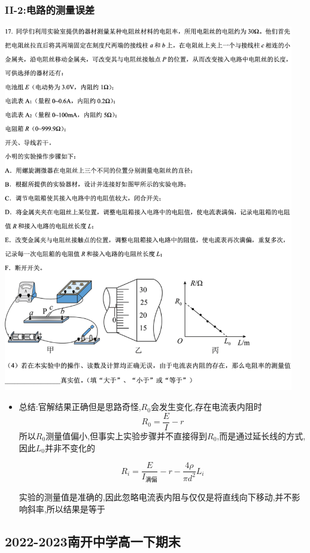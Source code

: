 \documentclass{article}
\begin{document}
\subsubsection{II-2:电路的测量误差}
\includegraphics[width=0.95\textwidth,keepaspectratio]{./pictures/1.3-3.png}

\begin{itemize}
    \item 总结:\quad 官解结果正确但是思路奇怪,$R_{0}$会发生变化,存在电流表内阻时
          $$
              R_{0} = \frac{E}{I} - r
          $$
          所以$R_{0}$测量值偏小,但事实上实验步骤并不直接得到$R_{0}$,而是通过延长线的方式,因此$L_{0}$并非不变化的

          $$
              R_{i} = \frac{E}{I_{满偏}} - r -\frac{4\rho}{\pi d^{2}} L_{i}
          $$

          实验的测量值是准确的,因此忽略电流表内阻与仅仅是将直线向下移动,并不影响斜率,所以结果是等于
\end{itemize}

\vspace{2em}

\subsection{2022-2023南开中学高一下期末}
\end{document}
